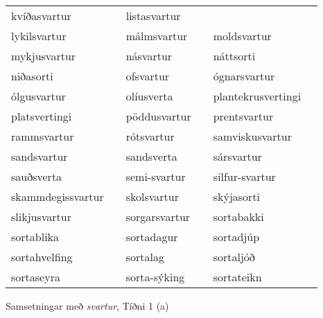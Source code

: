 \documentclass[../samsetningasafn.tex]{subfiles}
\begin{document}
\begin{wordlist}[H]
\begin{tcolorbox}
\begin{tabular}{BlBlBl}
		kvíðasvartur		&		& 
		listasvartur		&		\\  %
		lykilsvartur		&		& 
		málmsvartur		& 		& 
		moldsvartur		& 		\\  %
		mykjusvartur		&		& 
		násvartur			&		& 
		náttsorti			&		\\  %
		niðasorti			&		& 
		ofsvartur			&		& 
		ógnarsvartur		&		\\  %
		ólgusvartur		&		& 
		olíusverta			&		& 
		plantekrusvertingi	&		\\  %
		platsvertingi		&		& 
		pöddusvartur		&		& 
		prentsvartur		&		\\  %
		rammsvartur		&		& 
		rótsvartur		&		& 
		samviskusvartur	&		\\  %
		sandsvartur		&		& 
		sandsverta		&		& 
		sársvartur		&		\\  %
		sauðsverta		&		& 
		semi-svartur		&		& 
		silfur-svartur		&		\\  %
		skammdegissvartur	&		& 
		skolsvartur		&		& 
		skýjasorti			&		\\  %
		slikjusvartur		&		& 
		sorgarsvartur		&		& 
		sortabakki		&		\\  %
		sortablika			&		& 
		sortadagur		&		& 
		sortadjúp			&		\\  %
		sortahvelfing		&		& 
		sortalag			&		& 
		sortaljóð			&		\\  %
		sortaseyra		&		& 
		sorta-sýking		& 		& 
		sortateikn			&		  %
	\end{tabular}
\end{tcolorbox}
	\caption{Samsetningar með \textit{svartur}, Tíðni 1 (a)}
	\label{listi:svart.1a}
\end{wordlist}	
\end{document}
